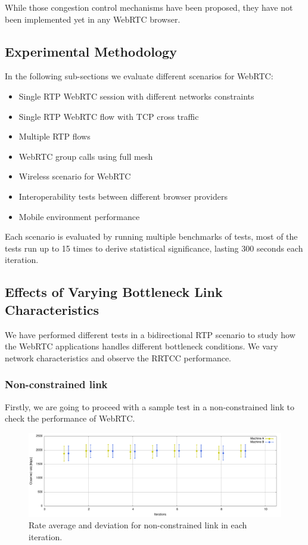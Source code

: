 While those congestion control mechanisms have been proposed, they have not been implemented yet in any WebRTC browser.

\subsection{Experimental Methodology}

In the following sub-sections we evaluate different scenarios for WebRTC:

\begin{itemize}
\item Single RTP WebRTC session with different networks constraints
\item Single RTP WebRTC flow with TCP cross traffic
\item Multiple RTP flows
\item WebRTC group calls using full mesh
\item Wireless scenario for WebRTC
\item Interoperability tests between different browser providers
\item Mobile environment performance
\end{itemize}

Each scenario is evaluated by running multiple benchmarks of tests, most of the tests run up to 15 times to derive statistical significance, lasting 300 seconds each iteration.

\subsection{Effects of Varying Bottleneck Link Characteristics}

We have performed different tests in a bidirectional RTP scenario to study how the WebRTC applications handles different bottleneck conditions. We vary network characteristics and observe the RRTCC performance. 

\subsubsection{Non-constrained link}

Firstly, we are going to proceed with a sample test in a non-constrained link to check the performance of WebRTC.
 
 \begin{figure}[h]
  \centering
    \includegraphics[width=1\textwidth]{./figures/no_ipfw.pdf}
      \caption[Rate average and deviation for non-constrained link in each iteration]{Rate average and deviation for non-constrained link in each iteration.}
	\label{fig:no_ipfw}
\end{figure}

